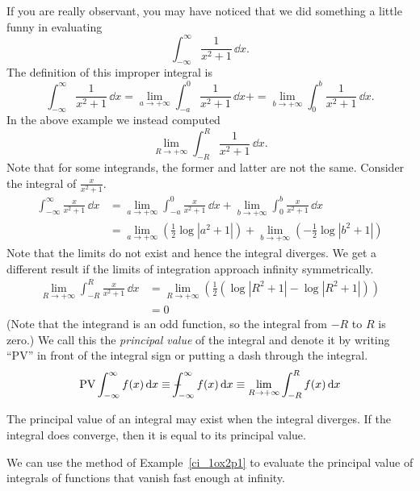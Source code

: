 If you are really observant, you may have noticed that we did something a 
little funny in evaluating 
\[
\int_{-\infty}^\infty \frac{1}{x^2+1}\,\dd x.
\]
The definition of this improper integral is
\[
\int_{-\infty}^\infty \frac{1}{x^2+1}\,\dd x 
= \lim_{a \to +\infty} \int_{-a}^0 \frac{1}{x^2+1}\,\dd x +
= \lim_{b \to +\infty} \int_0^b \frac{1}{x^2+1}\,\dd x. 
\]
In the above example we instead computed 
\[
\lim_{R \to +\infty} \int_{-R}^R \frac{1}{x^2+1}\,\dd x.
\]
Note that for some integrands, the former and latter are not the same.
Consider the integral of $\frac{x}{x^2+1}$.
\begin{align*}
  \int_{-\infty}^\infty \frac{x}{x^2+1} \,\dd x
  &= \lim_{a \to +\infty} \int_{-a}^0 \frac{x}{x^2+1}\,\dd x +
  \lim_{b \to +\infty} \int_0^b \frac{x}{x^2+1}\,\dd x \\
  &= \lim_{a \to +\infty} \left(\frac{1}{2} \log|a^2+1| \right) +
  \lim_{b \to +\infty} \left( - \frac{1}{2} \log|b^2+1| \right) 
\end{align*}
Note that the limits do not exist and hence the integral diverges.
We get a different result if the limits of integration approach infinity
symmetrically.
\begin{align*}
  \lim_{R \to +\infty} \int_{-R}^R \frac{x}{x^2+1} \,\dd x
  &= \lim_{R \to +\infty} \left( \frac{1}{2} (\log |R^2+1| 
    - \log |R^2+1|) \right) \\
  &= 0
\end{align*}
(Note that the integrand is an odd function, so the integral from $-R$ to $R$
is zero.)  We call this the \textit{principal value} of the integral and 
denote it by writing ``PV'' in front of the integral sign or putting a dash
through the integral.
\[
\mathop{\mathrm{PV}}\nolimits \int_{-\infty}^\infty f(x) \,\mathrm{d} x 
\equiv - \negthickspace \negthickspace \negthickspace \negmedspace \int_{-\infty}^\infty f(x) \,\mathrm{d} x
\equiv \lim_{R \to +\infty} \int_{-R}^R f(x)\,\mathrm{d} x
\]

The principal value of an integral may exist when the integral diverges.
If the integral does converge, then it is equal to its principal value.



We can use the method of 
Example~\ref{ci_1ox2p1} to evaluate the principal value of
integrals of functions that vanish fast enough at infinity.  


